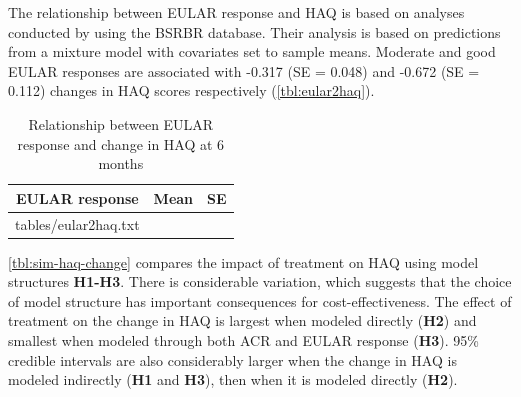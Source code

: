 \documentclass[11pt,final,fleqn]{article}\usepackage[]{graphicx}\usepackage[]{color}
\makeatletter
\theoremstyle{plain}
\newcommand*\ExpandableInput[1]{\@@input#1 }
\makeatother
\begin{document}
The relationship between EULAR response and HAQ is based on analyses conducted by \citet{stevenson2016adalimumab} using the BSRBR database. Their analysis is based on predictions from a mixture model with covariates set to sample means. Moderate and good EULAR responses are associated with -0.317 (SE = 0.048) and -0.672 (SE = 0.112) changes in HAQ scores respectively (\autoref{tbl:eular2haq}). 

\begin{table}[!ht]
\begin{center}
\begin{threeparttable}
\caption{Relationship between EULAR response and change in HAQ at 6 months} \label{tbl:eular2haq}
\begin{tabularx}{\textwidth}{@{\extracolsep{\fill}}lcc}
\hline
\multicolumn{1}{c}{EULAR response} & \multicolumn{1}{c}{Mean} & \multicolumn{1}{c}{SE} \\
\hline
\ExpandableInput{tables/eular2haq.txt}
\hline
\end{tabularx}
\scriptsize
\end{threeparttable}
\end{center}
\end{table}

\autoref{tbl:sim-haq-change} compares the impact of treatment on HAQ using model structures \textbf{H1-H3}. There is considerable variation, which suggests that the choice of model structure has important consequences for cost-effectiveness. The effect of treatment on the change in HAQ is largest when modeled directly (\textbf{H2}) and smallest when modeled through both ACR and EULAR response (\textbf{H3}). 95\% credible intervals are also considerably larger when the change in HAQ is modeled indirectly (\textbf{H1} and \textbf{H3}), then when it is modeled directly (\textbf{H2}). 
\end{document}
